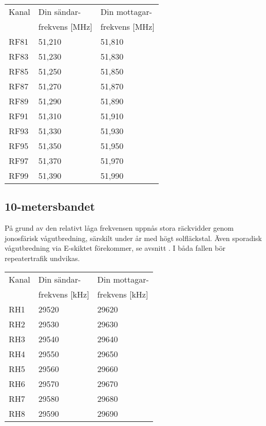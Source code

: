 \bigskip

\begin{tabular}{ l | l | l }
  Kanal & Din sändar- & Din mottagar- \\
        & frekvens [\unit{\mega\hertz}] & frekvens [\unit{\mega\hertz}] \\
  \hline
  RF81 & 51,210 & 51,810 \\
  RF83 & 51,230 & 51,830 \\
  RF85 & 51,250 & 51,850 \\
  RF87 & 51,270 & 51,870 \\
  RF89 & 51,290 & 51,890 \\
  RF91 & 51,310 & 51,910 \\
  RF93 & 51,330 & 51,930 \\
  RF95 & 51,350 & 51,950 \\
  RF97 & 51,370 & 51,970 \\
  RF99 & 51,390 & 51,990 \\
\end{tabular}


\subsection{10-metersbandet}

På grund av den relativt låga frekvensen uppnås stora räckvidder genom
jonosfärisk vågutbredning, särskilt under år med högt solfläckstal.
Även sporadisk vågutbredning via E-skiktet förekommer, se avsnitt
. I båda fallen bör repeatertrafik undvikas.

\bigskip

\begin{tabular}{ l | l | l }
  Kanal & Din sändar- & Din mottagar- \\
        & frekvens [\unit{\kilo\hertz}] & frekvens [\unit{\kilo\hertz}] \\
  \hline
  RH1 & 29520 & 29620 \\
  RH2 & 29530 & 29630 \\
  RH3 & 29540 & 29640 \\
  RH4 & 29550 & 29650 \\
  RH5 & 29560 & 29660 \\
  RH6 & 29570 & 29670 \\
  RH7 & 29580 & 29680 \\
  RH8 & 29590 & 29690 \\
\end{tabular}
